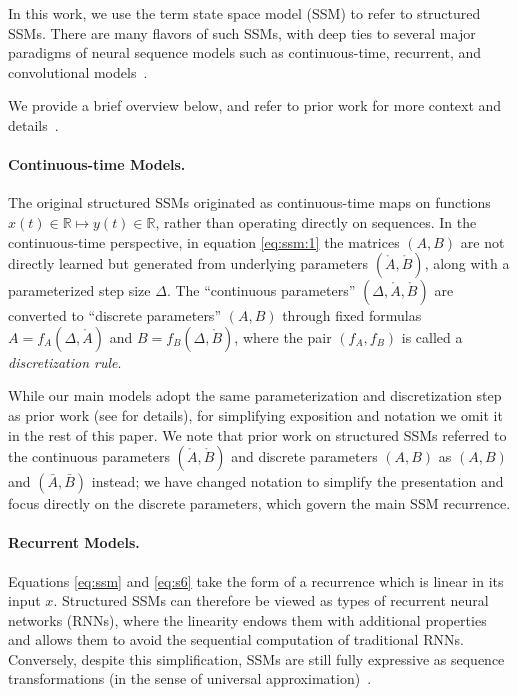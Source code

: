 In this work, we use the term state space model (SSM) to refer to structured SSMs. There are many flavors of such SSMs, with deep ties to several major paradigms of neural sequence models such as continuous-time, recurrent, and convolutional models~\citep{gu2021combining}.

  We provide a brief overview below, and refer to prior work for more context and details~\citep{gu2023thesis,gu2023mamba}.

\paragraph{Continuous-time Models.} The original structured SSMs originated as continuous-time maps on functions $x(t) \in \mathbb{R} \mapsto y(t) \in \mathbb{R}$, rather than operating directly on sequences. In the continuous-time perspective, in equation \eqref{eq:ssm:1} the matrices $(A, B)$ are not directly learned but generated from underlying parameters $(\mathring{A}, \mathring{B})$, along with a parameterized step size $\Delta$.
The ``continuous parameters'' $(\Delta, \mathring{A}, \mathring{B})$ are converted to ``discrete parameters'' $(A, B)$ through fixed formulas $A = f_A(\Delta, \mathring{A})$ and $B = f_B(\Delta, \mathring{B})$,
where the pair $(f_A, f_B)$ is called a \emph{discretization rule}.

\begin{remark}
  While our main models adopt the same parameterization and discretization step as prior work (see \citep{gu2023mamba} for details), for simplifying exposition and notation we omit it in the rest of this paper. We note that prior work on structured SSMs referred to the continuous parameters $(\mathring{A}, \mathring{B})$ and discrete parameters $(A, B)$ as $(A, B)$ and $(\bar{A}, \bar{B})$ instead; we have changed notation to simplify the presentation and focus directly on the discrete parameters, which govern the main SSM recurrence.
\end{remark}

\paragraph{Recurrent Models.}

Equations \eqref{eq:ssm} and \eqref{eq:s6} take the form of a recurrence which is linear in its input $x$. Structured SSMs can therefore be viewed as types of recurrent neural networks (RNNs), where the linearity endows them with additional properties and allows them to avoid the sequential computation of traditional RNNs. Conversely, despite this simplification, SSMs are still fully expressive as sequence transformations (in the sense of universal approximation)~\citep{kaul2020linear,orvieto2023resurrecting,wang2023state}.

